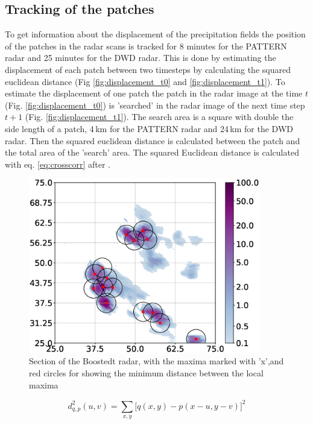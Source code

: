 \documentclass[11pt,twoside,a4paper,fleqn,x11names]{report}
\numberwithin{equation}{chapter}
\numberwithin{figure}{chapter}
\numberwithin{table}{chapter}
\begin{document}
\subsection{Tracking of the patches}
To get information about the displacement of the precipitation fields the position of the patches in the radar scans is tracked for 8 minutes for the PATTERN radar and 25 minutes for the DWD radar. This is done by estimating the displacement of each patch between two timesteps by calculating the squared euclidean distance (Fig \ref{fig:displacement_t0} and \ref{fig:displacement_t1}). To estimate the displacement of one patch the patch in the radar image at the time $t$ (Fig. \ref{fig:displacement_t0}) is 'searched' in the radar image of the next time step $t + 1$ (Fig. \ref{fig:displacement_t1}). The search area is a square with double the side length of a patch, 4\,km for the PATTERN radar and 24\,km for the DWD radar. Then the squared euclidean distance is calculated between the patch and the total area of the 'search' area. The squared Euclidean distance is calculated with eq. \ref{eq:crosscorr} after \cite{crosscorr}. 
\begin{figure}[H]
	\centering
	\includegraphics[width=0.9\textwidth]{maximaOverviewZoom.eps}
	\caption{Section of the Boostedt radar, with the maxima marked with 'x',and red circles for showing the minimum distance between the local maxima}
	\label{fig:maximaOverviewZoom}
\end{figure}
\begin{equation}
d^2_{q,p}(u,v) = \sum_{x,y}^{}\big[q(x,y)-p(x-u,y-v)\big]^2
\label{eq:crosscorr}
\end{equation}
\end{document}
